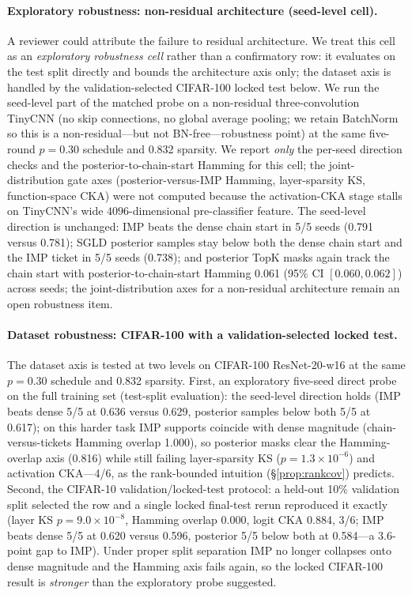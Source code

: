 \documentclass{article}
\begin{document}
\paragraph{Exploratory robustness: non-residual architecture (seed-level cell).}
A reviewer could attribute the failure to residual architecture. We treat
this cell as an \emph{exploratory robustness cell} rather than a
confirmatory row: it evaluates on the test split directly and bounds the
architecture axis only; the dataset axis is handled by the
validation-selected CIFAR-100 locked test below.
We run the seed-level part of the matched probe on a non-residual
three-convolution TinyCNN (no skip connections, no global average pooling;
we retain BatchNorm so this is a non-residual---but not BN-free---robustness
point) at the same five-round $p{=}0.30$ schedule and 0.832 sparsity. We report
\emph{only} the per-seed direction checks and the
posterior-to-chain-start Hamming for this cell; the joint-distribution gate
axes (posterior-versus-IMP Hamming, layer-sparsity KS, function-space CKA)
were not computed because the activation-CKA stage stalls on TinyCNN's wide
$4096$-dimensional pre-classifier feature. The seed-level direction is
unchanged: IMP beats the dense chain start in 5/5 seeds (0.791 versus 0.781);
SGLD posterior samples stay below both the dense chain start and the IMP
ticket in 5/5 seeds (0.738); and posterior TopK masks again track the chain
start with posterior-to-chain-start Hamming 0.061 (95\% CI $[0.060,0.062]$)
across seeds; the joint-distribution axes for a non-residual architecture
remain an open robustness item.

\paragraph{Dataset robustness: CIFAR-100 with a validation-selected locked test.}
The dataset axis is tested at two levels on CIFAR-100 ResNet-20-w16 at the
same $p{=}0.30$ schedule and 0.832 sparsity. First, an exploratory
five-seed direct probe on the full training set (test-split evaluation):
the seed-level direction holds (IMP beats dense 5/5 at 0.636 versus 0.629,
posterior samples below both 5/5 at 0.617); on this harder task IMP
supports coincide with dense magnitude (chain-versus-tickets Hamming
overlap 1.000), so posterior masks clear the Hamming-overlap axis (0.816)
while still failing layer-sparsity KS ($p = 1.3\times10^{-6}$) and
activation CKA---4/6, as the rank-bounded intuition (§\ref{prop:rankcov})
predicts. Second, the CIFAR-10 validation/locked-test protocol: a held-out
10\% validation split selected the row and a single locked final-test
rerun reproduced it exactly (layer KS $p = 9.0\times10^{-8}$, Hamming
overlap 0.000, logit CKA 0.884, 3/6; IMP beats dense 5/5 at 0.620 versus
0.596, posterior 5/5 below both at 0.584---a 3.6-point gap to IMP). Under
proper split separation IMP no longer collapses onto dense magnitude and
the Hamming axis fails again, so the locked CIFAR-100 result is
\emph{stronger} than the exploratory probe suggested.
\end{document}

